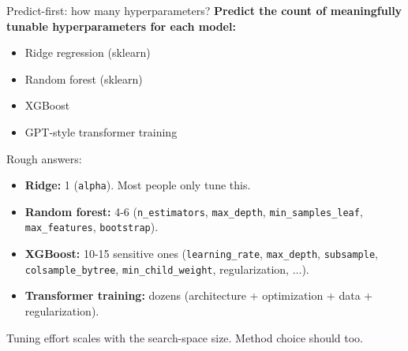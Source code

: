 \documentclass[aspectratio=169]{beamer}
\begin{document}
\begin{frame}{Predict-first: how many hyperparameters?}
  \pause
  \textbf{Predict the count of meaningfully tunable hyperparameters for each model:}
  \begin{itemize}
    \item Ridge regression (sklearn)
    \item Random forest (sklearn)
    \item XGBoost
    \item GPT-style transformer training
  \end{itemize}
  \vfill
  \pause
  Rough answers:
  \begin{itemize}
    \item \textbf{Ridge:} 1 (\texttt{alpha}). Most people only tune this.
    \item \textbf{Random forest:} 4-6 (\texttt{n\_estimators}, \texttt{max\_depth}, \texttt{min\_samples\_leaf}, \texttt{max\_features}, \texttt{bootstrap}).
    \item \textbf{XGBoost:} 10-15 sensitive ones (\texttt{learning\_rate}, \texttt{max\_depth}, \texttt{subsample}, \texttt{colsample\_bytree}, \texttt{min\_child\_weight}, regularization, $\ldots$).
    \item \textbf{Transformer training:} dozens (architecture + optimization + data + regularization).
  \end{itemize}
  Tuning effort scales with the search-space size. Method choice should too.
\end{frame}
\end{document}
